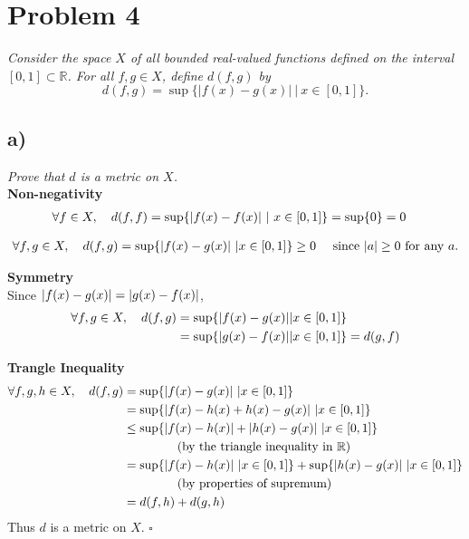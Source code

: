\documentclass[12pt]{article}
\begin{document}
\section*{Problem 4}
{\it Consider the space $X$ of all bounded real-valued functions defined on the interval $[0,1] \subset \mathbb{R}$.  For all $f,g \in X$, define $d(f,g)$ by}
\begin{equation}
	\label{problem_4_definition}
	d(f, g) = \sup\{|f(x) - g(x)|\ |\ x \in [0,1]\}.
\end{equation}

\subsection*{ a)}
{\it Prove that $d$ is a metric on $X$.} \\

\noindent\textbf{Non-negativity}
\begin{align*}
  \forall f \in X,\ \ \ d(f,f) &= \sup\{\abs{f(x) - f(x)}\ |\ x \in [0,1]\} = \sup\{0\} = 0
\end{align*}

\begin{align*}
  \forall f,g \in X,\ \ \ d(f,g) = \sup\{\abs{f(x) - g(x)}\ | x \in [0,1]\} \geq 0\ \ \ \ \text{since $\abs{a} \geq 0$ for any $a$.}
\end{align*}

\noindent\textbf{Symmetry}\\
Since $\abs{f(x) - g(x)} = \abs{g(x) - f(x)}$,
\begin{align*}
  \forall f,g \in X,\ \ \ d(f,g) &= \sup\{\abs{f(x) - g(x)} | x \in [0,1]\} \\
  &= \sup\{\abs{g(x) - f(x)} | x \in [0,1]\}  = d(g,f)
\end{align*}

\noindent\textbf{Trangle Inequality}
\begin{align*}
  \forall f,g,h \in X,\ \ \ d(f,g) &= \sup\{\abs{f(x) - g(x)}\ | x \in [0,1]\} \\
  &= \sup\{\abs{f(x) - h(x) + h(x) - g(x)}\ | x \in [0,1]\} \\
  &\leq \sup\{\abs{f(x) - h(x)} + \abs{h(x) - g(x)}\ | x \in [0,1]\} \\
  &\hphantom{mmmmm} \text{(by the triangle inequality in $\mathbb{R}$)}\\
  &= \sup\{\abs{f(x) - h(x)}\ | x \in [0,1]\} + \sup\{\abs{h(x) - g(x)}\ | x \in [0,1]\} \\
  &\hphantom{mmmmm} \text{(by properties of supremum)} \\
  &= d(f, h) + d(g, h)
\end{align*}
Thus $d$ is a metric on $X$. \hfill $\square$
\end{document}
